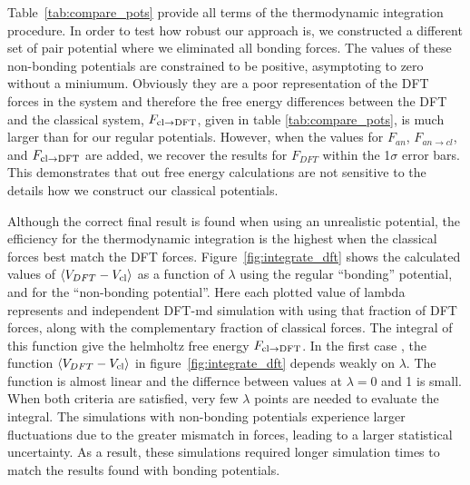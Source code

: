 Table~\ref{tab:compare_pots} provide all terms of the thermodynamic
integration procedure. In order to test how robust our approach is, we
constructed a different set of pair potential where we eliminated all
bonding forces. The values of these non-bonding potentials are constrained
to be positive, asymptoting to zero without a miniumum. Obviously they are a poor representation of the DFT forces
in the system and therefore the free energy differences between the DFT and
the classical system, $F_{\rm cl \to DFT}$, given in table
\ref{tab:compare_pots}, is much larger than for our regular potentials.
However, when the values for $F_{an}$, $F_{an \to cl}$, and $F_{\rm cl \to
DFT}$ are added, we recover the results for $F_{DFT}$ within the 1$\sigma$
error bars. This demonstrates that out free energy calculations are not
sensitive to the details how we construct our classical potentials.



Although the correct final result is found when using an unrealistic
potential, the efficiency for the thermodynamic integration is the highest
when the classical forces best match the DFT forces.
Figure~\ref{fig:integrate_dft} shows the calculated values of $\left<
V_{DFT} - V_{\rm cl} \right>$ as a function of $\lambda$ using the regular
``bonding'' potential, and for the ``non-bonding potential''. Here each
plotted value of lambda represents and independent DFT-md simulation with
using that fraction of DFT forces, along with the complementary fraction of
classical forces. The integral of this function give the helmholtz free
energy $F_{\rm cl \to DFT}$. In the first case , the function $\left<
V_{DFT}-V_{\rm cl}\right>$ in figure~\ref{fig:integrate_dft} depends weakly
on $\lambda$. The function is almost linear and the differnce between
values at $\lambda=0$ and 1 is small. When both criteria are satisfied,
very few $\lambda$ points are needed to evaluate the integral. The
simulations with non-bonding potentials experience larger fluctuations  due
to the greater mismatch in forces, leading to a larger statistical
uncertainty.  As a result, these simulations required longer simulation
times to match the results found with bonding potentials.

